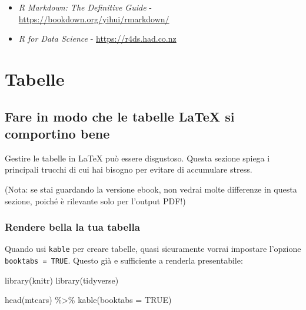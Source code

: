 \documentclass[a4paper, 11pt, nobind]{templates/ociamthesis}
\newenvironment{Shaded}{\begin{snugshade}}{\end{snugshade}}
\newcommand{\AttributeTok}[1]{\textcolor[rgb]{0.77,0.63,0.00}{#1}}
\newcommand{\ConstantTok}[1]{\textcolor[rgb]{0.00,0.00,0.00}{#1}}
\newcommand{\FunctionTok}[1]{\textcolor[rgb]{0.00,0.00,0.00}{#1}}
\newcommand{\NormalTok}[1]{#1}
\newcommand{\SpecialCharTok}[1]{\textcolor[rgb]{0.00,0.00,0.00}{#1}}
\renewenvironment{Shaded}
{
  \vspace{10pt}%
  \begin{snugshade}%
}{%
  \end{snugshade}%
  \vspace{8pt}%
}
\begin{document}
\begin{itemize}
\item
  \emph{R Markdown: The Definitive Guide} - \url{https://bookdown.org/yihui/rmarkdown/}
\item
  \emph{R for Data Science} - \url{https://r4ds.had.co.nz}
\end{itemize}

\hypertarget{tables}{%
\chapter{Tabelle}\label{tables}}

\minitoc 

\hypertarget{fare-in-modo-che-le-tabelle-latex-si-comportino-bene}{%
\section{Fare in modo che le tabelle LaTeX si comportino bene}\label{fare-in-modo-che-le-tabelle-latex-si-comportino-bene}}

Gestire le tabelle in LaTeX può essere disgustoso.
Questa sezione spiega i principali trucchi di cui hai bisogno per evitare di accumulare stress.

(Nota: se stai guardando la versione ebook, non vedrai molte differenze in questa sezione, poiché è rilevante solo per l'output PDF!)

\hypertarget{rendere-bella-la-tua-tabella}{%
\subsection{Rendere bella la tua tabella}\label{rendere-bella-la-tua-tabella}}

Quando usi \texttt{kable} per creare tabelle, quasi sicuramente vorrai impostare l'opzione \texttt{booktabs\ =\ TRUE}.
Questo già e sufficiente a renderla presentabile:

\begin{Shaded}
\begin{Highlighting}[]
\FunctionTok{library}\NormalTok{(knitr)}
\FunctionTok{library}\NormalTok{(tidyverse)}

\FunctionTok{head}\NormalTok{(mtcars) }\SpecialCharTok{\%\textgreater{}\%} 
  \FunctionTok{kable}\NormalTok{(}\AttributeTok{booktabs =} \ConstantTok{TRUE}\NormalTok{)}
\end{Highlighting}
\end{Shaded}
\end{document}
